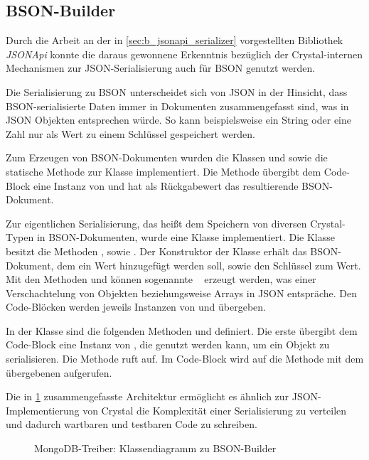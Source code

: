 \subsection{BSON-Builder}
\label{ssec:bm_bson_builder}

Durch die Arbeit an der in \cref{sec:b_jsonapi_serializer} vorgestellten
Bibliothek \emph{JSONApi} konnte die daraus gewonnene Erkenntnis bezüglich der
Crystal-internen Mechanismen zur JSON-Serialisierung auch für BSON genutzt
werden.

Die Serialisierung zu BSON unterscheidet sich von JSON in der Hinsicht, dass
BSON-serialisierte Daten immer in Dokumenten zusammengefasst sind, was in JSON
Objekten entsprechen würde.  So kann beispielsweise ein String oder eine Zahl
nur als Wert zu einem Schlüssel gespeichert werden.

Zum Erzeugen von BSON-Dokumenten wurden die Klassen  und
 sowie die statische Methode  zur
Klasse  implementiert.  Die Methode übergibt dem Code-Block eine
Instanz von  und hat als Rückgabewert das resultierende
BSON-Dokument.

Zur eigentlichen Serialisierung, das heißt dem Speichern von diversen
Crystal-Typen in BSON-Dokumenten, wurde eine Klasse 
implementiert.  Die Klasse besitzt die Methoden ,
 sowie .  Der Konstruktor der
Klasse erhält das BSON-Dokument, dem ein Wert hinzugefügt werden soll, sowie
den Schlüssel zum Wert.  Mit den Methoden  und
 können sogenannte ~\cite{mongo-embedded-docs} erzeugt werden, was einer Verschachtelung
von Objekten beziehungsweise Arrays in JSON entspräche.  Den Code-Blöcken werden
jeweils Instanzen von  und 
übergeben.

In der Klasse  sind die folgenden Methoden  und  definiert.  Die erste übergibt dem
Code-Block eine Instanz von , die genutzt werden kann, um
ein Objekt zu serialisieren.  Die Methode  ruft
 auf.  Im Code-Block wird auf  die
Methode  mit dem übergebenen 
aufgerufen.

Die in \cref{fig:mongocr_builder_klassendiagramm} zusammengefasste Architektur
ermöglicht es ähnlich zur JSON-Im\-ple\-men\-tie\-rung von Crystal die
Komplexität einer Serialisierung zu verteilen und dadurch wartbaren und
testbaren Code zu schreiben.

\begin{figure}
	\centering
	
	\caption{MongoDB-Treiber: Klassendiagramm zu BSON-Builder}
	\label{fig:mongocr_builder_klassendiagramm}
\end{figure}
